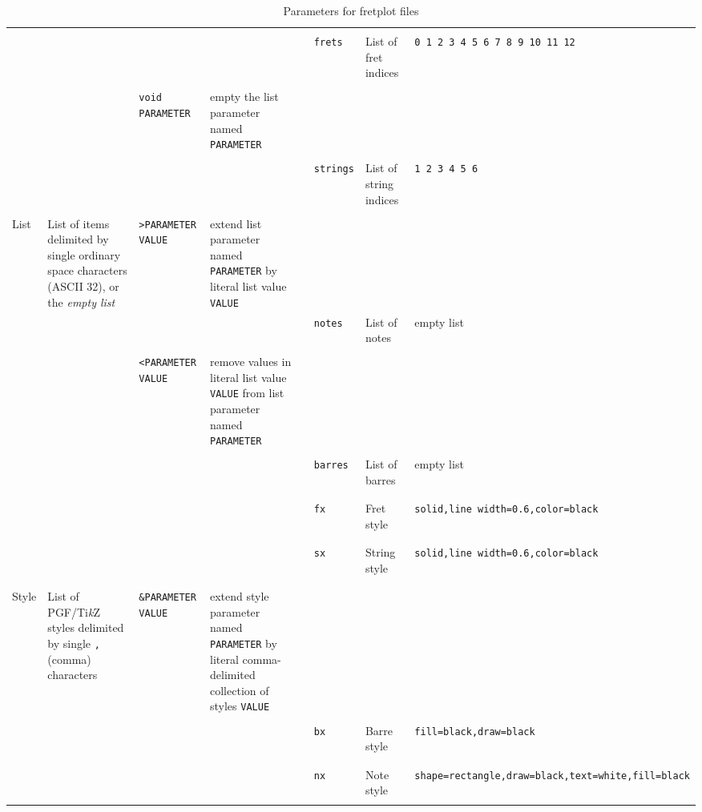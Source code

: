 \documentclass[12pt,letterpaper]{article}
\begin{document}
\begin{table}[H]
\begin{tabular}{|l|p{1.5cm}|l|p{2.5cm}|p{1pt}|l|p{2.5cm}|l|}
&&&&&&&\\
&&&&&\texttt{frets}&List of fret indices&\texttt{0 1 2 3 4 5 6 7 8 9 10 11 12}\\
&&&&&&&\\
\cline{6-8}
&& \texttt{void PARAMETER} & empty the list parameter named \texttt{PARAMETER}&&&&\\
&&&&&&&\\
\cline{3-4}
&&&&&\texttt{strings}&List of string indices&\texttt{1 2 3 4 5 6}\\
&&&&&&&\\
\cline{6-8}
List& List of items delimited by single ordinary space characters (ASCII 32), or the \textit{empty list} &\texttt{>PARAMETER VALUE} & extend list parameter named \texttt{PARAMETER} by literal list value \texttt{VALUE}&&&&\\
\cline{3-4}
&&&&&\texttt{notes}&List of notes &empty list\\
&&&&&&&\\
\cline{6-8}
&&\texttt{<PARAMETER VALUE} & remove values in literal list value \texttt{VALUE} from list parameter named \texttt{PARAMETER}&&&&\\
&&&&&&&\\
&&&&&\texttt{barres}& List of barres &empty list\\
&&&&&&&\\

\hline

&&&&&&&\\
&&&&&\texttt{fx}&Fret style&\texttt{solid,line width=0.6,color=black}\\
&&&&&&&\\
\cline{6-8}
&&&&&&&\\
&&&&&\texttt{sx}&String style &\texttt{solid,line width=0.6,color=black}\\
&&&&&&&\\
\cline{6-8}
&&&&&&&\\
Style& List of PGF/Ti\textit{k}Z styles delimited by single \texttt{,} (comma) characters &\texttt{\&PARAMETER VALUE} & extend style parameter named \texttt{PARAMETER} by literal comma-delimited collection of styles \texttt{VALUE}&&&&\\
&&&&&&&\\
&&&&&\texttt{bx}&Barre style &\texttt{fill=black,draw=black}\\
&&&&&&&\\
\cline{6-8}
&&&&&&&\\
&&&&&\texttt{nx}& Note style &\texttt{shape=rectangle,draw=black,text=white,fill=black}\\
&&&&&&&\\

\hline
\end{tabular}\caption{Parameters for fretplot files}\end{table}
\normalsize
\end{document}
